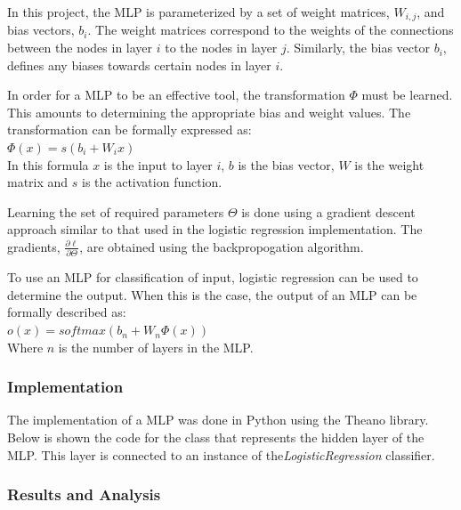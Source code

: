\documentclass{article}
\begin{document}
  In this project, the MLP is parameterized by a set of weight matrices, $W_{i,j}$, and bias vectors, $b_{i}$. The weight
  matrices correspond to the weights of the connections between the nodes in layer $i$ to the nodes in layer $j$. Similarly,
  the bias vector $b_{i}$, defines any biases towards certain nodes in layer $i$.
  
  In order for a MLP to be an effective tool, the transformation $\Phi$ must be learned. This amounts to determining the
  appropriate bias and weight values. The transformation can be formally expressed as: \\
  \vspace{1mm}
  \hspace{7mm}$\Phi(x) = s(b_{i} + W_{i}x)$ \\
  In this formula $x$ is the input to layer $i$, $b$ is the bias vector, $W$ is the weight matrix and $s$ is the activation
  function.
  
  Learning the set of required parameters $\Theta$ is done using a gradient descent approach similar to that used in the
  logistic regression implementation. The gradients, $\frac{\partial \ell}{\partial \Theta}$, are obtained using the
  backpropogation algorithm.
  
  To use an MLP for classification of input, logistic regression can be used to determine the output. When this is the case,
  the output of an MLP can be formally described as: \\
  \vspace{1mm}
  \hspace{7mm}$o(x) = softmax(b_{n} + W_{n} \Phi(x))$ \\
  Where $n$ is the number of layers in the MLP.
  
  \subsubsection{Implementation}
  
  The implementation of a MLP was done in Python using the Theano library. Below is shown the code for the class that
  represents the hidden layer of the MLP. This layer is connected to an instance of the\textit{LogisticRegression} classifier.
    
  
  \subsubsection{Results and Analysis} 
\end{document}
